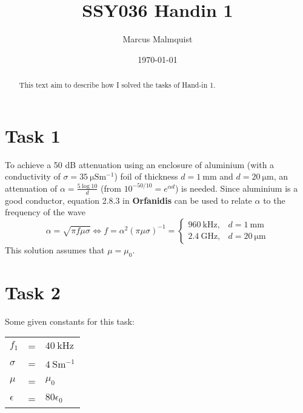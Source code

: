 \documentclass[12pt,a4paper]{article}
\begin{document}
\title{SSY036 Handin 1}
\author{Marcus Malmquist}
\date{\today}
\maketitle

\begin{abstract}
This text aim to describe how I solved the tasks of Hand-in 1.
\end{abstract}

\newpage
\tableofcontents
\newpage

\section{Task 1}
To achieve a 50 dB attenuation using an enclosure of aluminium (with a conductivity of $\sigma = \SI{35}{\micro\siemens\metre^{-1}}$) foil of thickness $d=\SI{1}{\milli\meter}$ and $d=\SI{20}{\micro\metre}$, an attenuation of $\alpha = \frac{5\log{10}}{d}$ (from $10^{-50/10}=e^{\alpha d}$) is needed. Since aluminium is a good conductor, equation 2.8.3 in \textbf{Orfanidis} can be used to relate $\alpha$ to the frequency of the wave 
\begin{equation}
  \alpha=\sqrt{\pi f \mu \sigma} \Leftrightarrow f=\alpha^2(\pi\mu\sigma)^{-1}=\begin{cases}\SI{960}{\kilo\hertz}, & d=\SI{1}{\milli\meter} \\ \SI{2.4}{\giga\hertz}, & d=\SI{20}{\micro\meter}\end{cases}
\end{equation}
This solution assumes that $\mu=\mu_0$.

\section{Task 2}
Some given constants for this task: \\
\begin{tabular}{|lcl|} \hline
  $f_1$ & = & $\SI{40}{\kilo\hertz}$ \\
  $\sigma$ & = & $\SI{4}{\siemens\metre^{-1}}$ \\
  $\mu$ & = & $\mu_0$ \\
  $\epsilon$ & = & $80\epsilon_0$ \\ \hline
\end{tabular}
\end{document}
